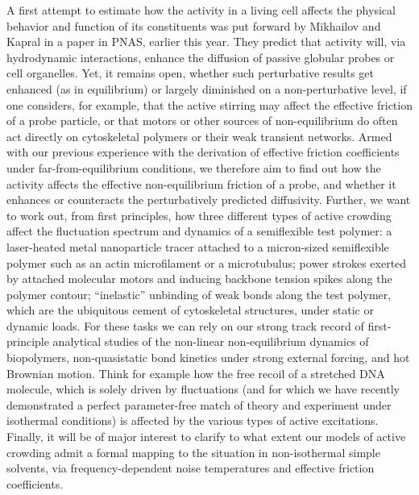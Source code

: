 \begin{workpackage}[id=WP_active,wphases=0-48,
  short=Active Particle Suspensions,%
  title=Probing Active Particle Suspensions with Colloids and Polymers,
  lead=Leipzig,
  LeipzigRM=12]
\begin{tasklist}
\begin{task}[title=Non-Equilibrium Equations of State (NEOS),id=task1,PM=15,lead=Leipzig,wphases=0-30!0.5]
  \end{task}

  \begin{task}[title=Active Crowding,id=task2,PM=15,lead=Leipzig,wphases=12-42!0.5]
    A first attempt to estimate how the activity in a living cell affects the physical behavior and function of its constituents was put forward by Mikhailov and Kapral in a paper in PNAS, earlier this year. 
    They predict that activity will, via hydrodynamic interactions, enhance the diffusion of passive globular probes or cell organelles.  
    Yet, it remains open, whether such perturbative results get enhanced (as in equilibrium) or largely diminished on a non-perturbative level, if one considers, for example, that the active stirring may affect the effective friction of a probe particle, or that motors or other sources of non-equilibrium do often act directly on cytoskeletal polymers or their weak transient networks.    
    Armed with our previous experience with the derivation of effective friction coefficients under far-from-equilibrium conditions, we therefore aim to find out how the activity affects the effective non-equilibrium friction of a probe, and whether it enhances or counteracts the perturbatively predicted diffusivity. 
    Further, we want to work out, from first principles, how three different types of active crowding affect the fluctuation spectrum and dynamics of a semiflexible test polymer: a laser-heated metal nanoparticle tracer attached to a micron-sized semiflexible polymer such as an actin microfilament or a microtubulus; power strokes exerted by attached molecular motors and inducing backbone tension spikes along the polymer contour; ``inelastic'' unbinding of weak bonds along the test polymer, which are the ubiquitous cement of cytoskeletal structures, under static or dynamic loads. 
    For these tasks we can rely on our strong track record of first-principle analytical studies of the non-linear non-equilibrium dynamics of biopolymers, non-quasistatic bond kinetics under strong external forcing, and hot Brownian motion. 
    Think for example how the free recoil of a stretched DNA molecule, which is solely driven by fluctuations (and for which we have recently demonstrated a perfect parameter-free match of theory and experiment under isothermal conditions) is affected by the various types of active excitations.  
    Finally, it will be of major interest to clarify to what extent our models of active crowding admit a formal mapping to the situation in non-isothermal simple solvents, via frequency-dependent noise temperatures and effective friction coefficients.
\end{task}



\end{tasklist}
\end{workpackage}
